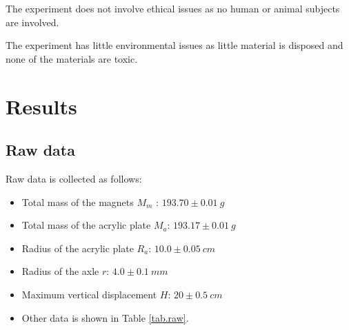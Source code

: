 \documentclass[a4paper]{article}
\begin{document}
The experiment does not involve ethical issues as no human or animal subjects are involved.

The experiment has little environmental issues as little material is disposed and none of the materials are toxic.

\section{Results}
\label{sec.results}

\subsection{Raw data}

Raw data is collected as follows:

\begin{itemize}
    \item Total mass of the magnets $M_m$ : $193.70\pm0.01\SI{}{g}$
    \item Total mass of the acrylic plate $M_a$: $193.17\pm0.01\SI{}{g}$
    \item Radius of the acrylic plate $R_a$: $10.0\pm0.05\SI{}{cm}$
    \item Radius of the axle $r$: $4.0\pm0.1\SI{}{mm}$
    \item Maximum vertical displacement $H$: $20\pm0.5\SI{}{cm}$
    \item Other data is shown in Table \ref{tab.raw}.
\end{itemize}
\end{document}
